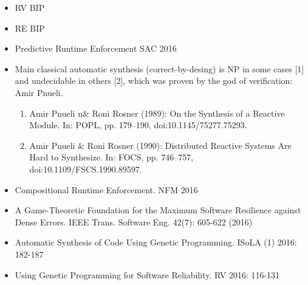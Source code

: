 \begin{itemize}
\item RV BIP 
\item RE BIP
\item Predictive Runtime Enforcement SAC 2016
\item Main classical automatic synthesis (correct-by-desing) is NP in some cases [1] and undecidable in others [2], which was proven by the god of verification: Amir Pnueli. 
\begin{enumerate}
\item Amir Pnueli n\& Roni Rosner (1989): On the Synthesis of a Reactive Module. In: POPL, pp. 179–190, doi:10.1145/75277.75293. 
\item Amir Pnueli \& Roni Rosner (1990): Distributed Reactive Systems Are Hard to Synthesize. In: FOCS, pp. 746–757, doi:10.1109/FSCS.1990.89597.  
\end{enumerate}
\item Compositional Runtime Enforcement. NFM 2016
\item A Game-Theoretic Foundation for the Maximum Software Resilience against Dense Errors. IEEE Trans. Software Eng. 42(7): 605-622 (2016)
\item Automatic Synthesis of Code Using Genetic Programming. ISoLA (1) 2016: 182-187
\item Using Genetic Programming for Software Reliability. RV 2016: 116-131
\end{itemize}